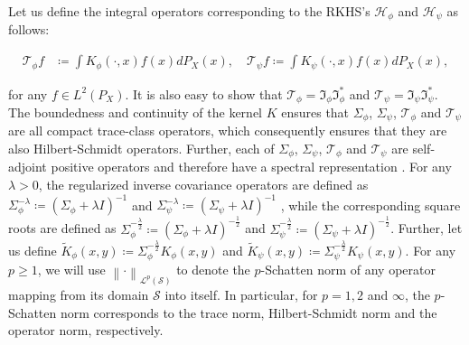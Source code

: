 \documentclass{article} %
\newcommand{\Lp}{\mathcal{L}^{p}}
\newcommand{\repone}{\phi}
\newcommand{\reptwo}{\psi}
\newcommand{\Hone}{\mathcal{H}_{\phi}}
\newcommand{\Htwo}{\mathcal{H}_{\psi}}
\newcommand{\norm}[1]{\left\|#1\right\|}
\newcommand{\LPtwo}{L^{2}(P_{X})}
\theoremstyle{plain}
\begin{document}
Let us define the integral operators corresponding to the RKHS's $\Hone$ and $\Htwo$ as follows:


\[
\begin{aligned}
    \mathcal{T}_{\repone} f &\coloneq \int K_{\repone}(\cdot,x) f(x) dP_{X}(x), \quad
    \mathcal{T}_{\reptwo} f \coloneq \int K_{\reptwo}(\cdot,x) f(x) dP_{X}(x),
\end{aligned}
\]

for any $f \in \LPtwo$.
It is also easy to show that $\mathcal{T}_{\repone} = \mathfrak{I}_{\repone}\mathfrak{I}_{\repone}^{*}$ and $\mathcal{T}_{\reptwo} = \mathfrak{I}_{\reptwo}\mathfrak{I}_{\reptwo} ^{*}$. The boundedness and continuity of the kernel $K$ ensures that $\Sigma_{\repone}$, $\Sigma_{\reptwo}$, $\mathcal{T}_{\repone}$ and $\mathcal{T}_{\reptwo}$ are all compact trace-class operators, which consequently ensures that they are also Hilbert-Schmidt operators. Further, each of $\Sigma_{\repone}$, $\Sigma_{\reptwo}$, $\mathcal{T}_{\repone}$ and $\mathcal{T}_{\reptwo}$ are self-adjoint positive operators and therefore have a spectral representation \citep[Theorems~VI.16,VI.17]{reed1980methods}. For any $\lambda>0$, the regularized inverse covariance operators are defined as $\Sigma_{\repone}^{-\lambda} \coloneq \left(\Sigma_{\repone} + \lambda I\right)^{-1}$ and $\Sigma_{\reptwo}^{-\lambda} \coloneq \left(\Sigma_{\reptwo} + \lambda I\right)^{-1}$ , while the corresponding square roots are defined as  $\Sigma_{\repone}^{-\frac{\lambda}{2}} \coloneq \left(\Sigma_{\repone} + \lambda I\right)^{-\frac{1}{2}}$ and $\Sigma_{\reptwo}^{-\frac{\lambda}{2}} \coloneq \left(\Sigma_{\reptwo} + \lambda I\right)^{-\frac{1}{2}}$. Further, let us  define $\widetilde{K}_{\repone}(x,y) \coloneq \Sigma_{\repone}^{-\frac{\lambda}{2}}K_{\repone}(x,y)$ and $\widetilde{K}_{\reptwo}(x,y)\coloneq \Sigma_{\reptwo}^{-\frac{\lambda}{2}}K_{\reptwo}(x,y)$. For any $p \geq 1$, we will use $\norm{\cdot}_{\Lp(\mathcal{S})}$ to denote the $p$-Schatten norm of any operator mapping from its domain $\mathcal{S}$ into itself. In particular, for $p=1,2$ and $\infty$, the $p$-Schatten norm corresponds to the trace norm, Hilbert-Schmidt norm and the operator norm, respectively.
\end{document}

